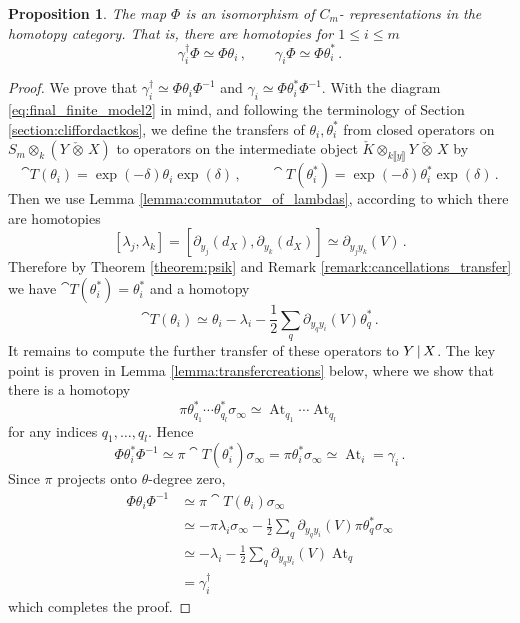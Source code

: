 \documentclass[english,letter paper,12pt,leqno]{article}
\newtheorem{proposition}[theorem]{Proposition}
\theoremstyle{example}
\numberwithin{equation}{section}
\def\be{\begin{equation}}
\def\ee{\end{equation}}
\def\ferm{\gamma}
\def\fermc{\gamma^\dagger}
\DeclareMathOperator{\At}{At}
\begin{document}
\begin{proposition}\label{prop:clifford_action} The map $\Phi$ is an isomorphism of $C_m$- representations in the homotopy category. That is, there are homotopies for $1 \le i \le m$
\[
\fermc_i \Phi \simeq \Phi \theta_i \,, \qquad \ferm_i \Phi \simeq \Phi \theta_i^*\,.
\]
\end{proposition}
\begin{proof}
We prove that $\fermc_i \simeq \Phi \theta_i \Phi^{-1}$ and $\ferm_i \simeq \Phi \theta_i^* \Phi^{-1}$. With the diagram \eqref{eq:final_finite_model2} in mind, and following the terminology of Section \ref{section:cliffordactkos}, we define the transfers of $\theta_i, \theta_i^*$ from closed operators on $S_m \otimes_k ( Y \,\check{\otimes}\, X )$ to operators on the intermediate object $\check{K} \otimes_{k\llbracket y \rrbracket} Y \,\check{\otimes}\, X$ by
\[
\cat{T}(\theta_i) = \exp(-\delta) \theta_i \exp(\delta)\,, \qquad \cat{T}(\theta_i^*) = \exp(-\delta) \theta_i^* \exp(\delta)\,.
\]
Then we use Lemma \ref{lemma:commutator_of_lambdas}, according to which there are homotopies
\[
[ \lambda_j, \lambda_k ] = [ \partial_{y_j}(d_X), \partial_{y_k}(d_X) ] \simeq \partial_{y_jy_k}(V)\,.
\]
Therefore by Theorem \ref{theorem:psik} and Remark \ref{remark:cancellations_transfer} we have $\cat{T}(\theta_i^*) = \theta_i^*$ and a homotopy
\be\label{eq:comp338h}
\cat{T}(\theta_i) \simeq \theta_i - \lambda_i - \frac{1}{2}\sum_q \partial_{y_q y_i}(V) \theta_q^*\,.
\ee
It remains to compute the further transfer of these operators to $Y \,|\, X$. The key point is proven in Lemma \ref{lemma:transfercreations} below, where we show that there is a homotopy
\be\label{eq:transfercr}
\pi \theta_{q_1}^* \cdots \theta_{q_l}^* \sigma_\infty \simeq \At_{q_1} \cdots \At_{q_l}
\ee
for any indices $q_1,\ldots,q_l$. Hence
\[
\Phi \theta_i^* \Phi^{-1} \simeq \pi \cat{T}(\theta_i^*) \sigma_\infty = \pi \theta_i^* \sigma_\infty \simeq \At_i = \ferm_i\,.
\]
Since $\pi$ projects onto $\theta$-degree zero,
\begin{align*}
\Phi \theta_i \Phi^{-1} &\simeq \pi \cat{T}(\theta_i) \sigma_\infty\\
&\simeq - \pi \lambda_i \sigma_\infty - \frac{1}{2} \sum_q \partial_{y_qy_i}(V) \pi \theta_q^* \sigma_\infty\\
&\simeq - \lambda_i - \frac{1}{2}\sum_q \partial_{y_qy_i}(V) \At_q\\
&= \fermc_i
\end{align*}
which completes the proof.
\end{proof}
\end{document}
